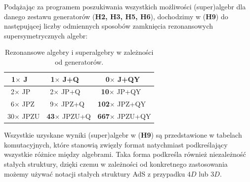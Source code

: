 \documentclass[12pt,a4paper]{article}
\begin{document}
Podążając za programem poszukiwania wszystkich możliwości (super)algebr dla danego zestawu generatorów (\textbf{H2, H3, H5, H6}), dochodzimy w (\textbf{H9}) do następującej liczby odmiennych sposobów zamknięcia rezonansowych supersymetrycznych algebr:
\begin{table}[h!]
	\label{table-superalgebras}
	\begin{center}
		\begin{tabular}{l|l|l}
			~1$\times$ J             & ~1$\times$ J+Q             & ~~0$\times$ J+QY             \\ \hline
			~2$\times$ JP            & ~2$\times$ JP+Q            & ~\textbf{10}$\times$ JP+QY    \\ \hline
			~6$\times$ JPZ    & ~9$\times$ JPZ+Q  & \textbf{102}$\times$ JPZ+QY  \\ \hline
			30$\times$ JPZU & \textbf{43}$\times$ JPZU+Q &\textbf{667}$\times$ JPZU+QY
		\end{tabular}
		\caption[]{Rezonansowe algebry i superalgebry w zależności od generatorów.}
	\end{center}
\end{table}

Wszystkie uzyskane wyniki (super)algebr w (\textbf{H9}) są przedstawione w tabelach komutacyjnych, które stanowią zwięzły format natychmiast podkreślający wszystkie różnice między algebrami. Taka forma podkreśla również niezależność stałych struktury, dzięki czemu w zależności od konkretnego zastosowania możemy używać notacji stałych struktury AdS z przypadku $4D$ lub $3D$.
\end{document}
